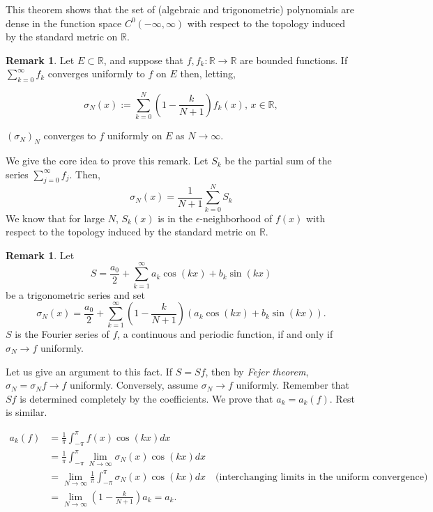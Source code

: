 \documentclass[12pt]{amsart}
\theoremstyle{definition}
\newtheorem{remark}[theorem]{Remark}
\newcommand{\RR}{{\mathbb R}} %
\begin{document}
This theorem shows that the set of (algebraic and trigonometric) polynomials are dense in the function space $C^{0}(-\infty, \infty)$ with respect to the topology induced by the standard metric on $\RR$.


\begin{remark}
    Let $E \subset \mathbb{R}$, and suppose that $f, f_k : \mathbb{R} \to \mathbb{R}$ are bounded functions. If $\sum_{k = 0}^{ \infty} f_k$ converges uniformly to $f$ on $E$ then, letting,

\[\sigma_N(x) := \sum_{k=0}^{N} (1 - \frac{k}{N+1}) f_k(x) \text{, $x \in \RR,$}
\]

$(\sigma_N)_N$ converges to $f$ uniformly on $E$ as $N \to \infty$.
\end{remark}


 We give the core idea to prove this remark. Let $S_k$ be the partial sum of the series  $\sum_{j = 0}^{\infty}f_j$. Then,
\[
\sigma_N(x) = \frac{1}{N+1} \sum_{k = 0}^{N}S_k
\]
We know that for large $N$, $S_k(x)$ is in the $\epsilon$-neighborhood of \(f(x)\) with respect to the topology induced by the standard metric on $\RR$.



\begin{remark}
    Let
    \[
    S = \frac{a_0}{2} +\sum_{k=1}^{\infty}a_k\cos(kx) + b_k\sin(kx)
    \]
    be a trigonometric series and set
    \[
    \sigma_N(x) = \frac{a_0}{2} +\sum_{k=1}^{\infty}(1 - \frac{k}{N+1})(a_k\cos(kx) + b_k\sin(kx)).
    \]
    $S$ is the Fourier series of $f$, a continuous and periodic function, if and only if $\sigma_N \to f$ uniformly.
\end{remark}


Let us give an argument to this fact.
    If $ S = Sf$, then by \textit{Fejer theorem}, $\sigma_N = \sigma_Nf \to f$ uniformly.
    Conversely, assume $\sigma_N \to f$ uniformly. Remember that $Sf$ is determined completely by the coefficients. We prove that $a_k = a_k(f)$. Rest is similar.

    \begin{align*}
        a_k(f) &= \frac{1}{\pi} \int_{-\pi}^{\pi} f(x) \cos(kx) dx\\
        &= \frac{1}{\pi} \int_{-\pi}^{\pi} \lim_{N \to \infty}\sigma_N(x) \cos(kx) dx \\
        &= \lim_{N \to \infty} \frac{1}{\pi} \int_{-\pi}^{\pi} \sigma_N(x) \cos(kx) dx \quad \text{(interchanging limits in the uniform convergence)}\\
        &= \lim_{N \to \infty} (1 - \frac{k}{N+1})a_k = a_k.       
    \end{align*}
\end{document}
